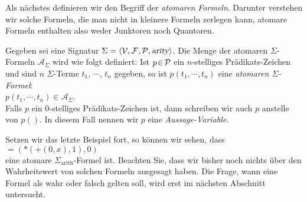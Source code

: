 Als n\"{a}chstes definieren wir den Begriff der {\emph{\color{blue}atomaren Formeln}}.  Darunter verstehen wir
solche Formeln, die man nicht in kleinere Formeln zerlegen kann, atomare Formeln enthalten also
weder Junktoren noch Quantoren. 
\begin{Definition}
  Gegeben sei eine Signatur $\Sigma = \langle \mathcal{V}, \mathcal{F}, \mathcal{P}, \textsl{arity} \rangle$. 
  Die Menge der atomaren $\Sigma$-Formeln $\mathcal{A}_\Sigma$
  wird wie folgt definiert:  Ist $p \!\in\! \mathcal{P}$ ein $n$-stelliges Pr\"{a}dikats-Zeichen
  und sind $n$ $\Sigma$-Terme $t_1$, $\cdots$, $t_n$ gegeben, so ist
  $p(t_1,\cdots,t_n)$ eine {\emph{\color{blue}atomaren $\Sigma$-Formel}}: \\[0.2cm]
  \hspace*{1.3cm} $p(t_1,\cdots,t_n) \in \mathcal{A}_\Sigma$.  \\[0.2cm]
  Falls $p$ ein 0-stelliges Pr\"{a}dikats-Zeichen ist, dann schreiben wir auch $p$ anstelle von $p()$.
  In diesem Fall nennen wir $p$ eine {\emph{\color{blue}Aussage-Variable}}.
  \eox
\end{Definition}

\example
Setzen wir das letzte Beispiel fort, so k\"{o}nnen wir sehen, dass \\[0.2cm]
\hspace*{1.3cm} $\mathtt{=}(*(\mathtt{+}(0,x),1),0)$ \\[0.2cm]
eine atomare $\Sigma_\mathrm{arith}$-Formel ist.  Beachten Sie, dass wir bisher noch nichts \"{u}ber den Wahrheitswert von solchen 
Formeln ausgesagt haben.  Die Frage, wann eine Formel als wahr oder falsch gelten soll,
wird erst im n\"{a}chsten Abschnitt untersucht.
\eox

